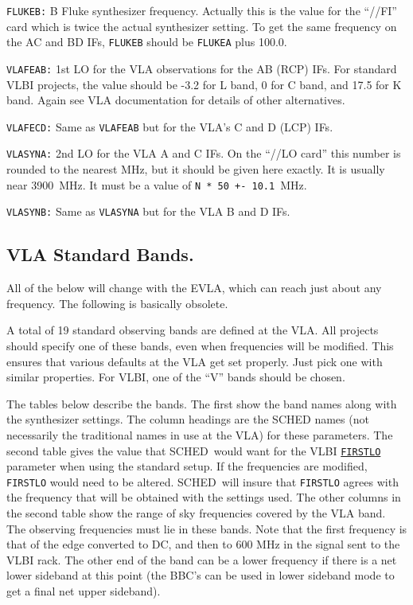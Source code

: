 \documentclass{report}
\newcommand{\schedb}{{\sc SCHED~}}
\begin{document}
\begin{list}{}{\parsep 0em  \itemsep 0em }
{\tt FLUKEB:} B Fluke synthesizer frequency.
Actually this is the value for the ``//FI'' card which is twice the
actual synthesizer setting.  To get the same frequency on the AC and
BD IFs, {\tt FLUKEB} should be {\tt FLUKEA} plus 100.0.

{\tt VLAFEAB:} 1st LO for the VLA observations
for the AB (RCP) IFs. For standard VLBI projects, the value should be
-3.2 for L band, 0 for C band, and 17.5 for K band. Again see VLA
documentation for details of other alternatives.

{\tt VLAFECD:} Same as {\tt VLAFEAB} but for
the VLA's C and D (LCP) IFs.

{\tt VLASYNA:} 2nd LO for the VLA A and C IFs.
On the ``//LO card'' this number is rounded to the nearest MHz, but it
should be given here exactly. It is usually near 3900~MHz. It must be
a value of {\tt N * 50 +- 10.1}~MHz.

\item {\tt VLASYNB:} Same as {\tt VLASYNA} but for
the VLA B and D IFs.

\end{list}

\subsection{\label{SSEC:VLASTDBD}VLA Standard Bands.}

All of the below will change with the EVLA, which can reach just about
any frequency.  The following is basically obsolete.

A total of 19 standard observing bands are defined at the VLA.  All
projects should specify one of these bands, even when frequencies will
be modified.  This ensures that various defaults at the VLA get set
properly.  Just pick one with similar properties.  For VLBI, one of the
``V'' bands should be chosen.

The tables below describe the bands.
The first show the band names along with the synthesizer settings.
The column headings are the SCHED names (not necessarily the traditional
names in use at the VLA) for these parameters.  The second table gives
the value that \schedb would want for the VLBI 
{\hyperref[SP:FIRSTLO]{{\tt FIRSTLO}}}
parameter when using the standard setup.  If the
frequencies are modified, {\tt FIRSTLO} would need to be altered.
\schedb will insure that {\tt FIRSTLO} agrees with the frequency
that will be obtained with the settings used.  The other columns
in the second table show the range of sky frequencies covered by
the VLA band.  The observing frequencies must lie in these bands.  Note
that the first frequency is that of the edge converted to DC, and then
to 600 MHz in the signal sent to the VLBI rack.  The other end of the
band can be a lower frequency if there is a net lower sideband at this
point (the BBC's can be used in lower sideband mode to get a final
net upper sideband).
\end{document}
